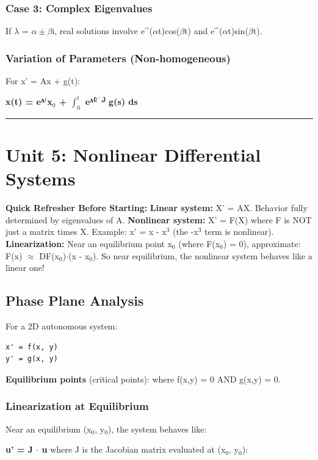 \documentclass[12pt,a4paper,openany]{book}
\begin{document}
{{\subsubsection{Case 3: Complex Eigenvalues}
If $\lambda$ = $\alpha\pm\beta$i, real solutions involve e^($\alpha$t)cos($\beta$t) and e^($\alpha$t)sin($\beta$t).

\subsubsection{Variation of Parameters (Non-homogeneous)}
For x' = Ax + g(t):

\textbf{x(t) = eᴬ$^t$x$_0$ + $\int_0^t$ eᴬ⁽$^t^{-}$ˢ⁾ g(s) ds}

\bigskip\noindent\rule{\textwidth}{0.4pt}\bigskip

\section{Unit 5: Nonlinear Differential Systems}

\begin{prereqbox}
 \textbf{Quick Refresher Before Starting:}
\textbf{Linear system:} X' = AX. Behavior fully determined by eigenvalues of A.
\textbf{Nonlinear system:} X' = F(X) where F is NOT just a matrix times X.
Example: x' = x - x$^3$ (the -x$^3$ term is nonlinear).
\textbf{Linearization:} Near an equilibrium point x$_0$ (where F(x$_0$) = 0), approximate: F(x) $\approx$ DF(x$_0$)$\cdot$(x - x$_0$).
So near equilibrium, the nonlinear system behaves like a linear one!
\end{prereqbox}


\subsection{Phase Plane Analysis}

For a 2D autonomous system:
\begin{verbatim}
x' = f(x, y)
y' = g(x, y)
\end{verbatim}

\textbf{Equilibrium points} (critical points): where f(x,y) = 0 AND g(x,y) = 0.

\subsubsection{Linearization at Equilibrium }
Near an equilibrium (x$_0$, y$_0$), the system behaves like:

\textbf{u' = J $\cdot$ u} where J is the Jacobian matrix evaluated at (x$_0$, y$_0$):

}}
\end{document}
